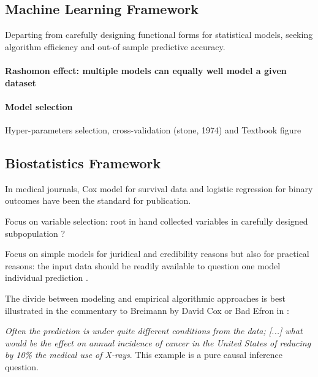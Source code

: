 \documentclass{report}
\begin{document}
\begin{baground_box_left}
  \subsection{Machine Learning Framework}\label{subsec:intro:machine_learning}

  Departing from carefully designing functional forms for statistical models,
  seeking algorithm efficiency and out-of sample predictive accuracy.

  \paragraph{Rashomon effect: multiple models can equally well model a given dataset}

  \paragraph{Model selection}
  Hyper-parameters selection, cross-validation (stone, 1974) and Textbook figure

  \subsection{Biostatistics Framework}\label{subsec:intro:biostatistics_framework}

  In medical journals, Cox model for survival data and logistic regression for
  binary outcomes have been the standard for publication.

  Focus on variable selection: root in hand collected variables in carefully
  designed subpopulation ?

  Focus on simple models for juridical and credibility reasons but also for
  practical reasons: the input data should be readily available to question one
  model individual prediction \citep{wyatt1995commentary}.

  The divide between modeling and empirical algorithmic approaches is best
  illustrated in the commentary to Breimann by David Cox or Bad Efron in  \cite{}:

  \textit{Often the prediction is under quite different conditions from the
  data; [...] what would be the effect on annual incidence of cancer in the
  United States of reducing by 10\% the medical use of X-rays}. This example is
  a pure causal inference question.

\end{baground_box_left}
\end{document}
